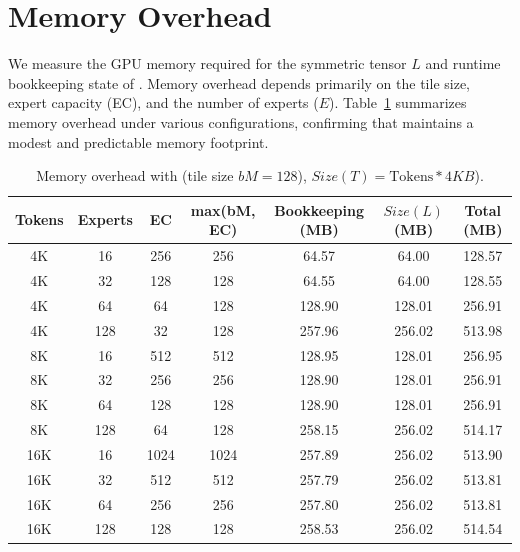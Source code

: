 \section{Memory Overhead}\label{sec:eval:memory}
We measure the GPU memory required for the symmetric tensor $L$ and runtime bookkeeping state of \sysname.
Memory overhead depends primarily on the tile size, expert capacity (EC), and the number of experts ($E$).
Table~\ref{tab:memory-overhead} summarizes memory overhead under various configurations, confirming that \sysname maintains a modest and predictable memory footprint.
\begin{table}[!ht]
    \centering
    \caption{Memory overhead with (tile size $bM = 128$), $Size(T) = \text{Tokens} * 4KB$).}
    \label{tab:memory-overhead}
    \setlength{\tabcolsep}{4pt}
    \renewcommand{\arraystretch}{0.9}
    \begin{tabular}{ccccccc}
        \toprule
        \textbf{Tokens} & \textbf{Experts} & \textbf{EC} & \textbf{max(bM, EC)} & \textbf{Bookkeeping (MB)} & $Size(L)$ \textbf{(MB)} & \textbf{Total (MB)} \\
        \midrule
        4K  & 16  & 256  & 256  & 64.57  & 64.00  & 128.57 \\
        4K  & 32  & 128  & 128  & 64.55  & 64.00  & 128.55 \\
        4K  & 64  & 64   & 128  & 128.90 & 128.01 & 256.91 \\
        4K  & 128 & 32   & 128  & 257.96 & 256.02 & 513.98 \\
        \midrule
        8K  & 16  & 512  & 512  & 128.95 & 128.01 & 256.95 \\
        8K  & 32  & 256  & 256  & 128.90 & 128.01 & 256.91 \\
        8K  & 64  & 128  & 128  & 128.90 & 128.01 & 256.91 \\
        8K  & 128 & 64   & 128  & 258.15 & 256.02 & 514.17 \\
        \midrule
        16K & 16  & 1024 & 1024 & 257.89 & 256.02 & 513.90 \\
        16K & 32  & 512  & 512  & 257.79 & 256.02 & 513.81 \\
        16K & 64  & 256  & 256  & 257.80 & 256.02 & 513.81 \\
        16K & 128 & 128  & 128  & 258.53 & 256.02 & 514.54 \\
        \bottomrule
    \end{tabular}
\end{table}
\clearpage